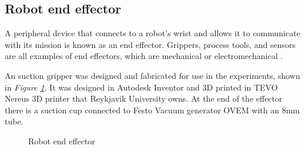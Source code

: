 
\subsection{Robot end effector\label{subsec:robotend}}
A peripheral device that connects to a robot's wrist and allows it to communicate with its mission is known as an end effector. Grippers, process tools, and sensors are all examples of end effectors, which are mechanical or electromechanical \cite{wilson_relative_1996}. 

An suction gripper was designed and fabricated for use in the experiments, shown in \textit{Figure \ref{figure: endeffector}}.
It was designed in Autodesk Inventor \cite{noauthor_inventor_nodate} and 3D printed in TEVO Nereus 3D printer that Reykjavik University owns. At the end of the effector there is a suction cup connected to Festo Vacuum generator OVEM with an 8mm tube.
\begin{figure}[ht]
    \centering
    \hfill
    \caption{Robot end effector}
    \label{figure: endeffector}
\end{figure}

